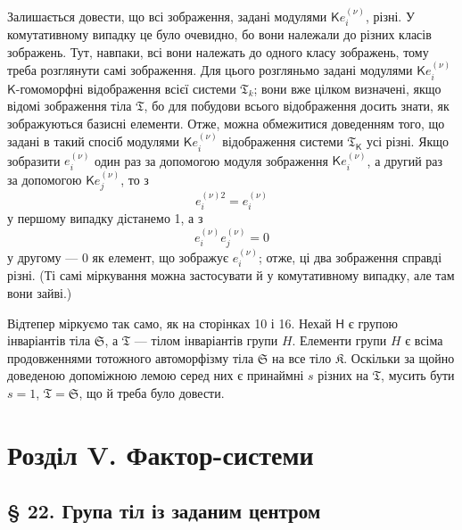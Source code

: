 \documentclass[11pt]{article}
\begin{document}
Залишається довести, що всі зображення, задані модулями \(\mathsf K e_i^{(\nu)}\), різні. У комутативному випадку це було очевидно, бо вони належали до різних класів зображень. Тут, навпаки, всі вони належать до одного класу зображень, тому треба розглянути самі зображення. Для цього розгляньмо задані модулями \(\mathsf K e_i^{(\nu)}\) \(\mathsf{K}\)-гомоморфні відображення всієї системи \(\mathfrak T_k\); вони вже цілком визначені, якщо відомі зображення тіла \(\mathfrak T\), бо для побудови всього відображення досить знати, як зображуються базисні елементи. Отже, можна обмежитися доведенням того, що задані в такий спосіб модулями \(\mathsf K e_i^{(\nu)}\) відображення системи \(\mathfrak T_{\mathsf{K}}\) усі різні. Якщо зобразити \(e_i^{(\nu)}\) один раз за допомогою модуля зображення \(\mathsf K e_i^{(\nu)}\), а другий раз за допомогою \(\mathsf K e_j^{(\nu)}\), то з
\[
e_i^{(\nu)2}=e_i^{(\nu)}
\]
у першому випадку дістанемо 1, а з
\[
e_i^{(\nu)}e_j^{(\nu)}=0
\]
у другому --- 0 як елемент, що зображує \(e_i^{(\nu)}\); отже, ці два зображення справді різні. (Ті самі міркування можна застосувати й у комутативному випадку, але там вони зайві.)

Відтепер міркуємо так само, як на сторінках 10 і 16. Нехай \(\mathsf{H}\) є групою інваріантів тіла \(\mathfrak S\), а \(\mathfrak T\) --- тілом інваріантів групи \(H\). Елементи групи \(H\) є всіма продовженнями тотожного автоморфізму тіла \(\mathfrak S\) на все тіло \(\mathfrak K\). Оскільки за щойно доведеною допоміжною лемою серед них є принаймні \(s\) різних на \(\mathfrak T\), мусить бути \(s=1\), \(\mathfrak T=\mathfrak S\), що й треба було довести.

\section*{Розділ V. Фактор-системи}\label{kapitel-v.-faktorensysteme}

\subsection*{§ 22. Група тіл із заданим центром}\label{die-gruppe-der-koerper-mit-gegebenem-zentrum}
\end{document}

